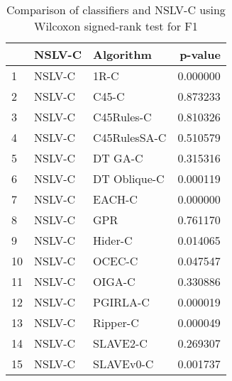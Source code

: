 \begin{table}
\footnotesize
\caption{Comparison of classifiers and NSLV-C using Wilcoxon signed-rank test for F1}
\label{tab:NSLV-C wilcoxon F1 comparison}
\begin{tabular}{lllr}
\hline
 & NSLV-C & Algorithm & p-value \\
\hline
1 & NSLV-C & 1R-C & 0.000000 \\
2 & NSLV-C & C45-C & 0.873233 \\
3 & NSLV-C & C45Rules-C & 0.810326 \\
4 & NSLV-C & C45RulesSA-C & 0.510579 \\
5 & NSLV-C & DT GA-C & 0.315316 \\
6 & NSLV-C & DT Oblique-C & 0.000119 \\
7 & NSLV-C & EACH-C & 0.000000 \\
8 & NSLV-C & GPR & 0.761170 \\
9 & NSLV-C & Hider-C & 0.014065 \\
10 & NSLV-C & OCEC-C & 0.047547 \\
11 & NSLV-C & OIGA-C & 0.330886 \\
12 & NSLV-C & PGIRLA-C & 0.000019 \\
13 & NSLV-C & Ripper-C & 0.000049 \\
14 & NSLV-C & SLAVE2-C & 0.269307 \\
15 & NSLV-C & SLAVEv0-C & 0.001737 \\
\hline
\end{tabular}
\end{table}
